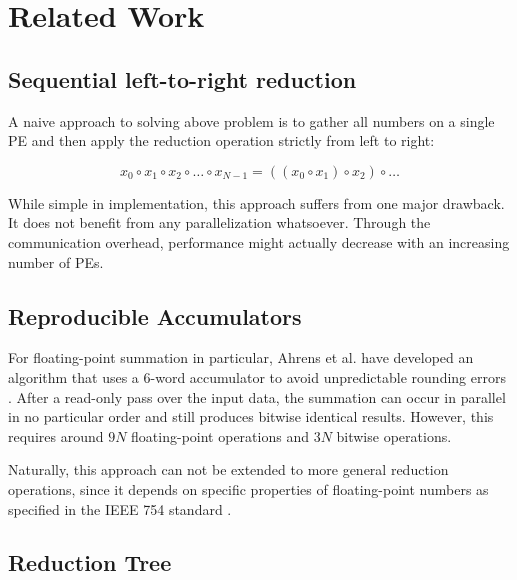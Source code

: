 \chapter{Related Work}
\label{ch:RelatedWork}

\section{Sequential left-to-right reduction}
\label{sec:SequentialLeftToRightAddition}


A naive approach to solving above problem is to gather all numbers on a single PE and then apply the reduction
operation strictly from left to right:

\begin{equation}
x_0 \circ x_1 \circ x_2 \circ \ldots  \circ x_{N-1} = ((x_0 \circ x_1) \circ x_2) \circ \ldots
\end{equation}

While simple in implementation, this approach suffers from one major drawback. It does not benefit from any
parallelization whatsoever. Through the communication overhead, performance might actually decrease with
an increasing number of PEs.


\section{Reproducible Accumulators}
\label{sec:Reproducible Accumulators}
For floating-point summation in particular, Ahrens et al. have developed an algorithm that uses a 6-word accumulator
to avoid unpredictable rounding errors \cite{ahrens_algorithms_2020}. After a read-only pass over the input data,
the summation can occur in parallel in no particular order and still produces bitwise identical results.
However, this requires around $9N$ floating-point operations and $3N$ bitwise operations.

Naturally, this approach can not be extended to more general reduction operations, since it depends on specific properties
of floating-point numbers as specified in the IEEE 754 standard \cite{noauthor_ieee_nodate-1}.


\section{Reduction Tree}
\label{sec:ReductionTree}

